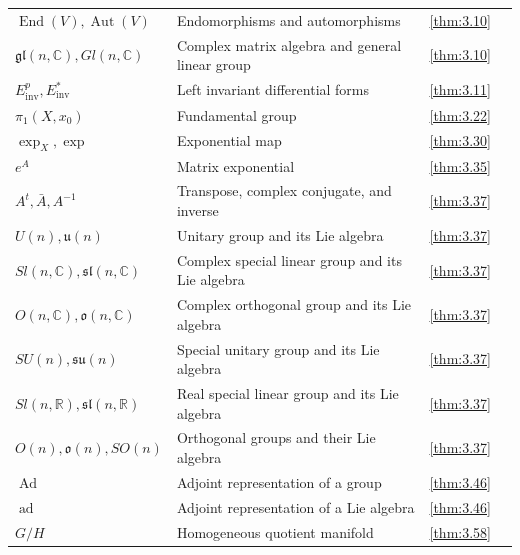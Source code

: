 {\begin{longtable}{@{}>{\raggedright\arraybackslash}p{.39\linewidth}>{\raggedright\arraybackslash}p{.39\linewidth}r r@{}}
$\operatorname{End}(V),\allowbreak \operatorname{Aut}(V)$ & Endomorphisms and automorphisms & \ref{thm:3.10} & \pageref{thm:3.10} \\
$\mathfrak{gl}(n,\allowbreak \mathbb C),\allowbreak Gl(n,\allowbreak \mathbb C)$ & Complex matrix algebra and general linear group & \ref{thm:3.10} & \pageref{thm:3.10} \\
$E_{\mathrm{inv}}^p,\allowbreak E_{\mathrm{inv}}^*$ & Left invariant differential forms & \ref{thm:3.11} & \pageref{thm:3.11} \\
$\pi_{1}(X,\allowbreak x_{0})$ & Fundamental group & \ref{thm:3.22} & \pageref{thm:3.22} \\
$\exp_X,\allowbreak \exp$ & Exponential map & \ref{thm:3.30} & \pageref{thm:3.30} \\
$e^{A}$ & Matrix exponential & \ref{thm:3.35} & \pageref{thm:3.35} \\
$A^t,\allowbreak \bar A,\allowbreak A^{-1}$ & Transpose, complex conjugate, and inverse & \ref{thm:3.37} & \pageref{thm:3.37} \\
$U(n),\allowbreak \mathfrak u(n)$ & Unitary group and its Lie algebra & \ref{thm:3.37} & \pageref{thm:3.37} \\
$Sl(n,\allowbreak \mathbb C),\allowbreak \mathfrak{sl}(n,\allowbreak \mathbb C)$ & Complex special linear group and its Lie algebra & \ref{thm:3.37} & \pageref{thm:3.37} \\
$O(n,\allowbreak \mathbb C),\allowbreak \mathfrak o(n,\allowbreak \mathbb C)$ & Complex orthogonal group and its Lie algebra & \ref{thm:3.37} & \pageref{thm:3.37} \\
$SU(n),\allowbreak \mathfrak{su}(n)$ & Special unitary group and its Lie algebra & \ref{thm:3.37} & \pageref{thm:3.37} \\
$Sl(n,\allowbreak \mathbb R),\allowbreak \mathfrak{sl}(n,\allowbreak \mathbb R)$ & Real special linear group and its Lie algebra & \ref{thm:3.37} & \pageref{thm:3.37} \\
$O(n),\allowbreak \mathfrak o(n),\allowbreak SO(n)$ & Orthogonal groups and their Lie algebra & \ref{thm:3.37} & \pageref{thm:3.37} \\
$\operatorname{Ad}$ & Adjoint representation of a group & \ref{thm:3.46} & \pageref{thm:3.46} \\
$\operatorname{ad}$ & Adjoint representation of a Lie algebra & \ref{thm:3.46} & \pageref{thm:3.46} \\
$G/H$ & Homogeneous quotient manifold & \ref{thm:3.58} & \pageref{thm:3.58} \\

\end{longtable}}
